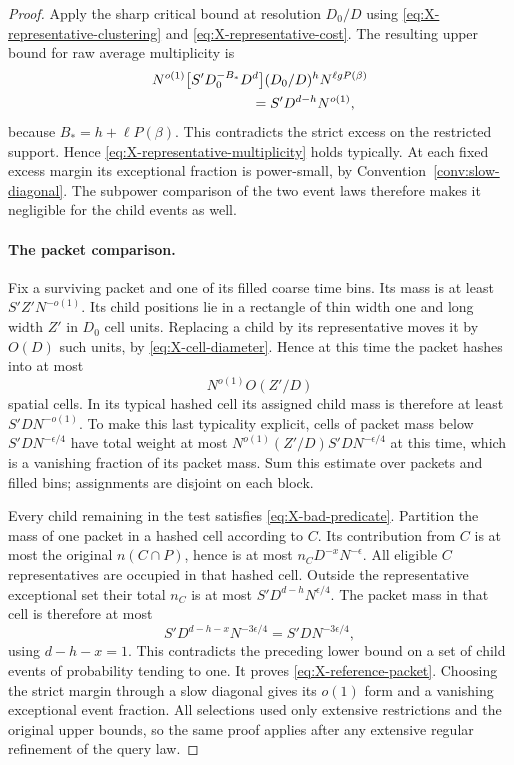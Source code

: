 \begin{proof}
Apply the sharp critical bound at resolution $D_0/D$ using
\eqref{eq:X-representative-clustering} and
\eqref{eq:X-representative-cost}. The resulting upper bound for
raw average multiplicity is
\begin{align*}
 &N^{o(1)}
   \bigl[S'D_0^{-B_*}D^d\bigr]
   (D_0/D)^h N^{\ell gP(\beta)}\\
 &\hspace{25mm}=S'D^{d-h}N^{o(1)},
\end{align*}
because $B_*=h+\ell P(\beta)$. This contradicts the strict excess
on the restricted support. Hence
\eqref{eq:X-representative-multiplicity} holds typically. At each fixed
excess margin its exceptional fraction is power-small, by
Convention~\ref{conv:slow-diagonal}. The subpower comparison of the two
event laws therefore makes it negligible for the child events as well.

\paragraph{The packet comparison.}
Fix a surviving packet and one of its filled coarse time bins. Its
mass is at least $S'Z'N^{-o(1)}$. Its child positions lie in a
rectangle of thin width one and long width $Z'$ in $D_0$ cell
units. Replacing a child by its representative moves it by
$O(D)$ such units, by \eqref{eq:X-cell-diameter}. Hence at this
time the packet hashes into at most
\[
 N^{o(1)}O(Z'/D)
\]
spatial cells. In its typical hashed cell its assigned child mass
is therefore at least $S'DN^{-o(1)}$. To make this last typicality
explicit, cells of packet mass below $S'DN^{-\epsilon/4}$ have
total weight at most
$N^{o(1)}(Z'/D)S'DN^{-\epsilon/4}$ at this time, which is a
vanishing fraction of its packet mass. Sum this estimate over
packets and filled bins; assignments are disjoint on each block.

Every child remaining in the test satisfies
\eqref{eq:X-bad-predicate}. Partition the mass of one packet in a
hashed cell according to $C$. Its contribution from $C$ is at most
the original $n(C\cap P)$, hence is at most
$n_CD^{-x}N^{-\epsilon}$. All eligible $C$ representatives are
occupied in that hashed cell. Outside the representative exceptional
set their total $n_C$ is at most
$S'D^{d-h}N^{\epsilon/4}$. The packet mass in that cell is
therefore at most
\[
 S'D^{d-h-x}N^{-3\epsilon/4}
 =S'DN^{-3\epsilon/4},
\]
using $d-h-x=1$. This contradicts the preceding lower bound on a
set of child events of probability tending to one. It proves
\eqref{eq:X-reference-packet}. Choosing the strict margin through
a slow diagonal gives its $o(1)$ form and a vanishing exceptional
event fraction. All selections used only extensive restrictions and
the original upper bounds, so the same proof applies after any
extensive regular refinement of the query law.


\end{proof}
